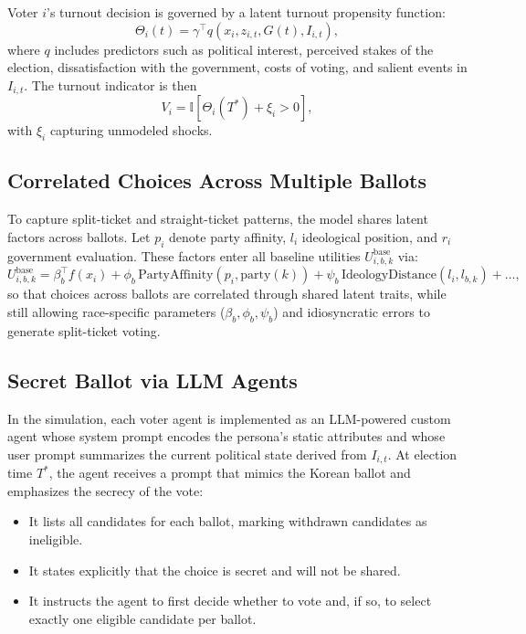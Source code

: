 \documentclass[11pt]{article}
\begin{document}
Voter $i$'s turnout decision is governed by a latent turnout propensity function:
\begin{equation}
\Theta_i(t) = \gamma^\top q(x_i, z_{i,t}, G(t), I_{i,t}),
\end{equation}
where $q$ includes predictors such as political interest, perceived stakes of the election, dissatisfaction with the government, costs of voting, and salient events in $I_{i,t}$. The turnout indicator is then
\begin{equation}
V_i = \mathbb{I}[\Theta_i(T^*) + \xi_i > 0],
\end{equation}
with $\xi_i$ capturing unmodeled shocks.

\subsection{Correlated Choices Across Multiple Ballots}

To capture split-ticket and straight-ticket patterns, the model shares latent factors across ballots. Let $p_i$ denote party affinity, $l_i$ ideological position, and $r_i$ government evaluation. These factors enter all baseline utilities $U^{\text{base}}_{i,b,k}$ via:
\begin{equation}
U^{\text{base}}_{i,b,k} = \beta_b^\top f(x_i) + \phi_b \, \text{PartyAffinity}(p_i, \text{party}(k)) + \psi_b \, \text{IdeologyDistance}(l_i, l_{b,k}) + \dots,
\end{equation}
so that choices across ballots are correlated through shared latent traits, while still allowing race-specific parameters ($\beta_b, \phi_b, \psi_b$) and idiosyncratic errors to generate split-ticket voting.

\subsection{Secret Ballot via LLM Agents}

In the simulation, each voter agent is implemented as an LLM-powered custom agent whose system prompt encodes the persona's static attributes and whose user prompt summarizes the current political state derived from $I_{i,t}$. At election time $T^*$, the agent receives a prompt that mimics the Korean ballot and emphasizes the secrecy of the vote:

\begin{itemize}
  \item It lists all candidates for each ballot, marking withdrawn candidates as ineligible.
  \item It states explicitly that the choice is secret and will not be shared.
  \item It instructs the agent to first decide whether to vote and, if so, to select exactly one eligible candidate per ballot.
\end{itemize}
\end{document}
